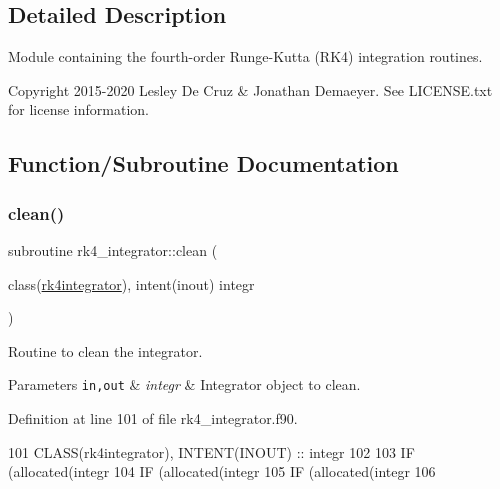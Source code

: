 \subsection{Detailed Description}
Module containing the fourth-\/order Runge-\/\+Kutta (R\+K4) integration routines. 

\begin{DoxyCopyright}{Copyright}
2015-\/2020 Lesley De Cruz \& Jonathan Demaeyer. See L\+I\+C\+E\+N\+S\+E.\+txt for license information. 
\end{DoxyCopyright}


\subsection{Function/\+Subroutine Documentation}
\mbox{\label{namespacerk4__integrator_a4883cf93b6d3ba274296d2d255059473}} 
\subsubsection{\texorpdfstring{clean()}{clean()}}
{\footnotesize\ttfamily subroutine rk4\+\_\+integrator\+::clean (\begin{DoxyParamCaption}\item[{class(\hyperlink{structrk4__integrator_1_1rk4integrator}{rk4integrator}), intent(inout)}]{integr }\end{DoxyParamCaption})\hspace{0.3cm}{\ttfamily [private]}}



Routine to clean the integrator. 


\begin{DoxyParams}[1]{Parameters}
\mbox{\tt in,out}  & {\em integr} & Integrator object to clean. \\
\hline
\end{DoxyParams}


Definition at line 101 of file rk4\+\_\+integrator.\+f90.


\begin{DoxyCode}
101       \textcolor{keywordtype}{CLASS}(rk4integrator), \textcolor{keywordtype}{INTENT(INOUT)} :: integr
102 
103       \textcolor{keywordflow}{IF} (\textcolor{keyword}{allocated}(integr%
104       \textcolor{keywordflow}{IF} (\textcolor{keyword}{allocated}(integr%
105       \textcolor{keywordflow}{IF} (\textcolor{keyword}{allocated}(integr%
106 
\end{DoxyCode}
\mbox{\label{namespacerk4__integrator_a28281cb923e5a74dcbc518a1ea2269b1}} 
